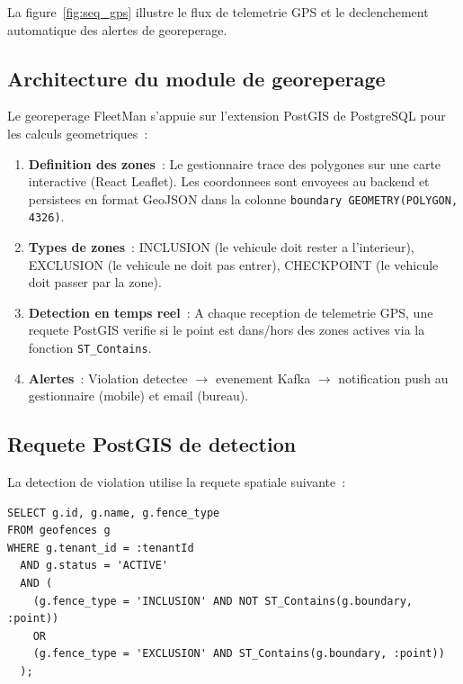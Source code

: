 \documentclass[12pt,a4paper]{report}
\begin{document}
La figure~\ref{fig:seq_gps} illustre le flux de telemetrie GPS
et le declenchement automatique des alertes de georeperage.

\subsection{Architecture du module de georeperage}

Le georeperage FleetMan s'appuie sur l'extension PostGIS de PostgreSQL
pour les calculs geometriques~:

\begin{enumerate}[leftmargin=2cm]
  \item \textbf{Definition des zones}~: Le gestionnaire trace des polygones
        sur une carte interactive (React Leaflet). Les coordonnees sont
        envoyees au backend et persistees en format GeoJSON dans la colonne
        \texttt{boundary GEOMETRY(POLYGON, 4326)}.
        
  \item \textbf{Types de zones}~: INCLUSION (le vehicule doit rester a
        l'interieur), EXCLUSION (le vehicule ne doit pas entrer), CHECKPOINT
        (le vehicule doit passer par la zone).
        
  \item \textbf{Detection en temps reel}~: A chaque reception de telemetrie
        GPS, une requete PostGIS verifie si le point est dans/hors des zones
        actives via la fonction \texttt{ST\_Contains}.
        
  \item \textbf{Alertes}~: Violation detectee $\to$ evenement Kafka
        $\to$ notification push au gestionnaire (mobile) et email (bureau).
\end{enumerate}

\subsection{Requete PostGIS de detection}

La detection de violation utilise la requete spatiale suivante~:

\begin{verbatim}
SELECT g.id, g.name, g.fence_type
FROM geofences g
WHERE g.tenant_id = :tenantId
  AND g.status = 'ACTIVE'
  AND (
    (g.fence_type = 'INCLUSION' AND NOT ST_Contains(g.boundary, :point))
    OR
    (g.fence_type = 'EXCLUSION' AND ST_Contains(g.boundary, :point))
  );
\end{verbatim}
\end{document}
